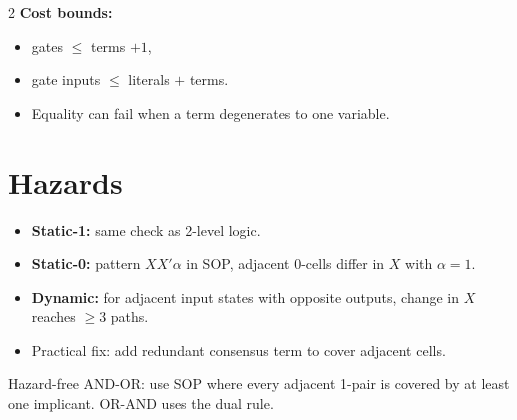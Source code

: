 \documentclass[10pt]{article}
\begin{document}
{\begin{multicols}{2}
\textbf{Cost bounds:}
\begin{itemize}
    \item gates $\le$ terms $+1$,
    \item gate inputs $\le$ literals $+$ terms.
    \item Equality can fail when a term degenerates to one variable.
\end{itemize}

\section*{Hazards}
\begin{itemize}
    \item \textbf{Static-1:} same check as 2-level logic.
    \item \textbf{Static-0:} pattern $XX'\alpha$ in SOP, adjacent 0-cells differ in $X$ with $\alpha=1$.
    \item \textbf{Dynamic:} for adjacent input states with opposite outputs, change in $X$ reaches $\ge 3$ paths.
    \item Practical fix: add redundant consensus term to cover adjacent cells.
\end{itemize}
Hazard-free AND-OR: use SOP where every adjacent 1-pair is covered by at least one implicant. OR-AND uses the dual rule.

\end{multicols}
}
\end{document}
